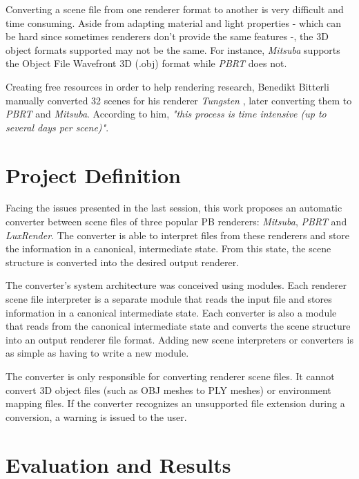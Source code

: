 \documentclass[cic,tc,english]{iiufrgs}
\begin{document}
Converting a scene file from one renderer format to another is very difficult and time consuming. Aside from adapting material and light properties - which can be hard since sometimes renderers don't provide the same features -, the 3D object formats supported may not be the same. For instance, \textit{Mitsuba} supports the Object File Wavefront 3D (.obj) format while \textit{PBRT} does not.

Creating free resources in order to help rendering research, Benedikt Bitterli \cite{bitterli} manually converted 32 scenes for his renderer \textit{Tungsten} \cite{tungsten}, later converting them to \textit{PBRT} and \textit{Mitsuba}. According to him, \textit{"this process is time intensive (up to several days per scene)"}. 


\section{Project Definition}

Facing the issues presented in the last session, this work proposes an automatic converter between scene files of three popular PB renderers: \textit{Mitsuba}, \textit{PBRT} and \textit{LuxRender}. The converter is able to interpret files from these renderers and store the information in a canonical, intermediate state. From this state, the scene structure is converted into the desired output renderer.

The converter's system architecture was conceived using modules. Each renderer scene file interpreter is a separate module that reads the input file and stores information in a canonical intermediate state. Each converter is also a module that reads from the canonical intermediate state and converts the scene structure into an output renderer file format. Adding new scene interpreters or converters is as simple as having to write a new module. 

The converter is only responsible for converting renderer scene files. It cannot convert 3D object files (such as OBJ meshes to PLY meshes) or environment mapping files. If the converter recognizes an unsupported file extension during a conversion, a warning is issued to the user.

\section{Evaluation and Results}
\end{document}
